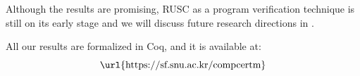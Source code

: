 Although the results are promising, RUSC as a program verification technique is still on its early stage and we will discuss future research directions in \todo{\ref{TODO}}.






\bigskip
All our results are formalized in Coq, and it is available at: \[ \text{\url{https://sf.snu.ac.kr/compcertm}} \]


